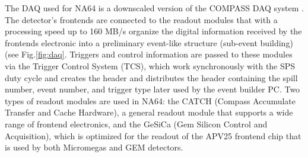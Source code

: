 The DAQ used for NA64 is a downscaled version of the COMPASS DAQ system \cite{Bodlak_2013,COMPASS-daq}. The detector's frontends are connected to the readout modules that with a processing speed up to 160 MB/s organize the digital information received by the frontends electronic into a preliminary event-like structure (sub-event building) (see Fig.\ref{fig:daq}. Triggers and control information are passed to these modules via the Trigger Control System (TCS), which work synchronously with the SPS duty cycle and creates the header and distributes the header containing the spill number, event number, and trigger type later used by the event builder PC. Two types of readout modules are used in NA64: the CATCH (Compass Accumulate Transfer and Cache Hardware), a general readout module that supports a wide range of frontend electronics, and the GeSiCa (Gem Silicon Control and Acquisition), which is optimized for the readout of the APV25 frontend chip that is used by both Micromegas and GEM detectors.

